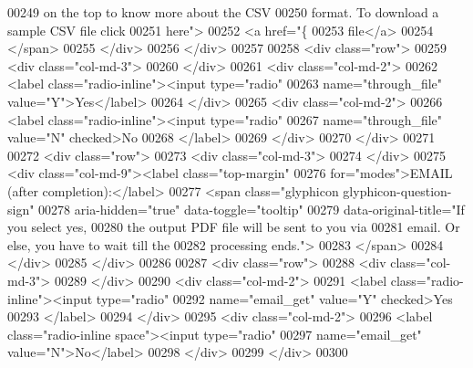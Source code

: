 \begin{DoxyCode}
00249                             on the top to know more about the CSV 
00250                             format. To download a sample CSV file click 
00251                             here">
00252                             <a href="\{%
00253                                 file</a> 
00254                         </span>
00255                     </div>
00256                 </div>
00257 
00258                <div class="row">
00259                     <div class="col-md-3">
00260                     </div>
00261                     <div class="col-md-2">
00262                         <label class="radio-inline"><input type="radio"
00263                             name="through\_file" value="Y">Yes</label>
00264                     </div>
00265                     <div class="col-md-2">
00266                         <label class="radio-inline"><input type="radio"
00267                            name="through\_file" value="N" checked>No
00268                         </label>
00269                     </div>
00270                 </div>
00271 
00272                 <div class="row">
00273                     <div class="col-md-3">
00274                     </div>
00275                     <div class="col-md-9"><label class="top-margin"
00276                         for="modes">EMAIL (after completion):</label>
00277                         <span class="glyphicon glyphicon-question-sign"
00278                             aria-hidden="true" data-toggle="tooltip"
00279                             data-original-title="If you select yes, 
00280                             the output PDF file will be sent to you via
00281                             email. Or else, you have to wait till the 
00282                             processing ends.">
00283                         </span>
00284                     </div>
00285                 </div>
00286                 
00287                 <div class="row">
00288                     <div class="col-md-3">
00289                     </div>
00290                     <div class="col-md-2">
00291                         <label class="radio-inline"><input type="radio"
00292                             name="email\_get" value="Y" checked>Yes
00293                         </label>
00294                     </div>
00295                     <div class="col-md-2">
00296                         <label class="radio-inline space"><input type="radio"
00297                             name="email\_get" value="N">No</label>
00298                     </div>
00299                 </div>
00300                 

\end{DoxyCode}
